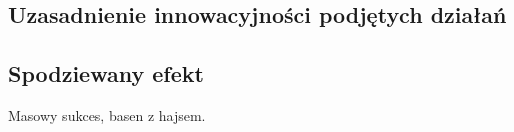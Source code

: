 \documentclass[12pt]{article}
\begin{document}
\subsection{Uzasadnienie innowacyjności podjętych działań }


\subsection{Spodziewany efekt }


Masowy sukces, basen z hajsem.





%
\end{document}

